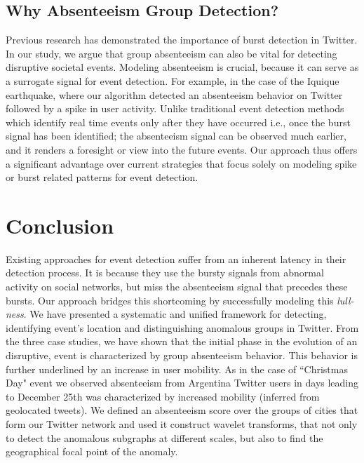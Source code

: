 \documentclass[conference]{IEEEtran}
\begin{document}
\subsection{Why Absenteeism Group Detection?}
Previous research has demonstrated the importance of burst detection in Twitter. In our study, we argue that group absenteeism can also be vital for detecting disruptive societal events. Modeling absenteeism is crucial, because it can serve as a surrogate signal for event detection. For example, in the case of the Iquique earthquake, where our algorithm  detected an absenteeism behavior on Twitter followed by a spike in user activity. Unlike traditional event detection methods which identify real time events only after they have occurred i.e., once the burst signal has been identified; the absenteeism signal can be observed much earlier, and it renders a foresight or view into the future events. Our approach thus offers a significant advantage over current strategies that focus solely on modeling spike or burst related patterns for event detection.


\section{Conclusion}
\label{sec:conclusion}
Existing approaches for event detection suffer from an inherent latency in their detection process. It is because they use the bursty signals from abnormal activity on social networks, but miss the absenteeism signal that precedes these bursts. Our approach bridges this shortcoming by successfully modeling this \textit{lull-ness}. We have presented a systematic and unified framework for detecting, identifying event's location and distinguishing anomalous groups in Twitter. From the three case studies, we have shown that the initial phase in the evolution of an disruptive, event is characterized by group absenteeism behavior. This behavior is further underlined by an increase in user mobility. As in the case of ``Christmas Day" event we observed absenteeism from Argentina Twitter users in days leading to December 25th was characterized by increased mobility (inferred from geolocated tweets). We defined an absenteeism score over the groups of cities that form our Twitter network and used it construct wavelet transforms, that not only to detect the anomalous subgraphs at different scales, but also to find the geographical focal point of the anomaly.
\end{document}
